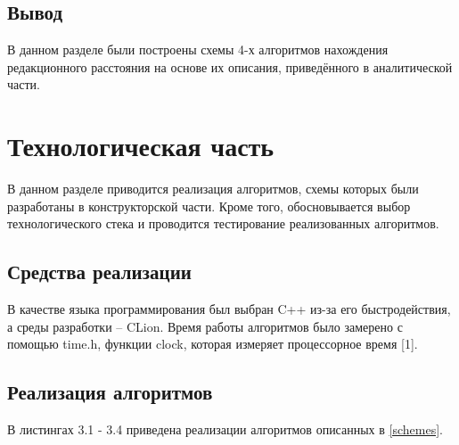 \documentclass{report}
\begin{document}
\section{Вывод}

В данном разделе были построены схемы 4-х алгоритмов нахождения редакционного расстояния на основе их описания, приведённого в аналитической части.
\chapter{Технологическая часть}
В данном разделе приводится реализация алгоритмов, схемы которых были разработаны в конструкторской части. Кроме того, обосновывается выбор технологического стека и проводится тестирование реализованных алгоритмов.
\section{Средства реализации}

В качестве языка программирования был выбран C++ из-за его быстродействия, а среды разработки -- CLion. Время работы алгоритмов было замерено с помощью time.h, функции clock, которая измеряет процессорное время [1].

\section{Реализация алгоритмов}

В листингах 3.1 - 3.4 приведена реализации алгоритмов описанных в \ref{schemes}.
\end{document}
